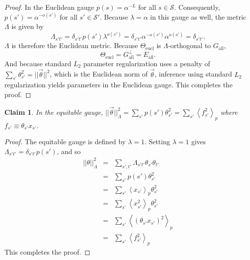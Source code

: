 \documentclass{article}
\numberwithin{myclaim}{section}
\newcommand{\braket}[1]{\left\langle #1 \right\rangle}
\newcommand{\todo}[1]{\textcolor{red}{[#1]}}
\newcommand{\myeucl}{\textrm{eucl}}
\newtheorem{claim}{Claim}
\begin{document}
\begin{proof}
In the Euclidean gauge $p(s) = \alpha^{-L}$ for all $s \in \mathcal{S}$. Consequently, $p(s') = \alpha^{-o(s')}$ for all $s' \in \mathcal{S}'$. Because $\lambda = \alpha$ in this gauge as well, the metric $\Lambda$ is given by
\begin{equation}
	\Lambda_{s't'} = \delta_{s't'} p(s') \lambda^{o(s')}  = \delta_{s't'} \alpha^{-o(s')} \alpha^{o(s')} = \delta_{s't'}. 
\end{equation}
$\Lambda$ is therefore the Euclidean metric. Because $\Theta_\myeucl$ is $\Lambda$-orthogonal to $G_\mathrm{all}$, 
\begin{equation}
	\Theta_\myeucl = G_\mathrm{all}^\perp = E_\mathrm{all}.
\end{equation}
And because standard $L_2$ parameter regularization uses a penalty of $\sum_{s'} \theta_{s'}^2 = ||\vec{\theta}||^2$, which is the Euclidean norm of $\vec{\theta}$, inference using standard $L_2$ regularization yields parameters in the Euclidean gauge. This completes the proof.
\end{proof}

\begin{claim}
In the equitable gauge, $||\vec{\theta}||^2_\Lambda = \sum_{s'} p(s') \theta_{s'}^2 = \sum_{s'} \braket{f_{s'}^2}_p$ where $f_{s'} \equiv \theta_{s'} x_{s'}$.
\end{claim}

\begin{proof}
The equitable gauge is defined by $\lambda=1$. Setting $\lambda=1$ gives $\Lambda_{s't'} = \delta_{s't'}p(s')$, and so
\begin{eqnarray}
	||\theta||^2_\Lambda 
            &=& \sum_{s',t'} \Lambda_{s't'} \theta_{s'} \theta_{t'}\\
		&=& \sum_{s'} p(s') \theta_{s'}^2 \\
		&=& \sum_{s'} \braket{x_{s'}}_p \theta_{s'}^2 \\
		&=& \sum_{s'} \braket{x_{s'}^2}_p \theta_{s'}^2 \\
		&=& \sum_{s'} \braket{\left(\theta_{s'} x_{s'}\right)^2}_p \\
            &=& \sum_{s'} \braket{f_{s'}^2}_p
\end{eqnarray}
This completes the proof.
\end{proof}

\end{document}
